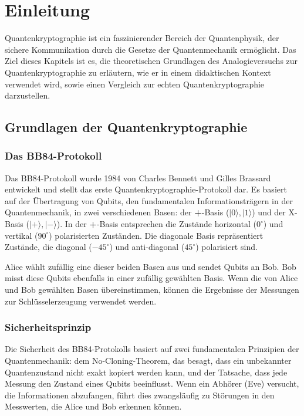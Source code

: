 \section{Einleitung}
Quantenkryptographie ist ein faszinierender Bereich der Quantenphysik, der sichere Kommunikation durch die Gesetze der Quantenmechanik ermöglicht. Das Ziel dieses Kapitels ist es, die theoretischen Grundlagen des Analogieversuchs zur Quantenkryptographie zu erläutern, wie er in einem didaktischen Kontext verwendet wird, sowie einen Vergleich zur echten Quantenkryptographie darzustellen.

\subsection{Grundlagen der Quantenkryptographie}
\subsubsection{Das BB84-Protokoll}
Das BB84-Protokoll wurde 1984 von Charles Bennett und Gilles Brassard entwickelt und stellt das erste Quantenkryptographie-Protokoll dar. Es basiert auf der Übertragung von Qubits, den fundamentalen Informationsträgern in der Quantenmechanik, in zwei verschiedenen Basen: der \textbf{+}-Basis (\( |0\rangle, |1\rangle \)) und der X-Basis (\( |+\rangle, |-\rangle \)). In der \textbf{+}-Basis entsprechen die Zustände horizontal (\(0^\circ\)) und vertikal (\(90^\circ\)) polarisierten Zuständen. Die diagonale Basis repräsentiert Zustände, die diagonal (\(-45^\circ\)) und anti-diagonal (\(45^\circ\)) polarisiert sind.

Alice wählt zufällig eine dieser beiden Basen aus und sendet Qubits an Bob. Bob misst diese Qubits ebenfalls in einer zufällig gewählten Basis. Wenn die von Alice und Bob gewählten Basen übereinstimmen, können die Ergebnisse der Messungen zur Schlüsselerzeugung verwendet werden.

\subsubsection{Sicherheitsprinzip}
Die Sicherheit des BB84-Protokolls basiert auf zwei fundamentalen Prinzipien der Quantenmechanik: dem No-Cloning-Theorem, das besagt, dass ein unbekannter Quantenzustand nicht exakt kopiert werden kann, und der Tatsache, dass jede Messung den Zustand eines Qubits beeinflusst. Wenn ein Abhörer (Eve) versucht, die Informationen abzufangen, führt dies zwangsläufig zu Störungen in den Messwerten, die Alice und Bob erkennen können.

